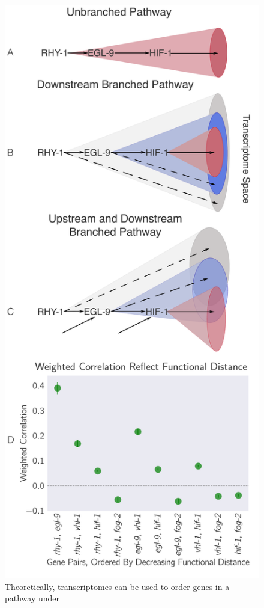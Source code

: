 \documentclass[9pt,twocolumn,twoside]{pnas-new}
\begin{document}
\begin{figure}[tbhp]
\centering
\includegraphics[width=.9\linewidth]{figs/decorrelation.pdf}
\caption{
Theoretically, transcriptomes can be used to order genes in a pathway under
}
\end{figure}
\end{document}
